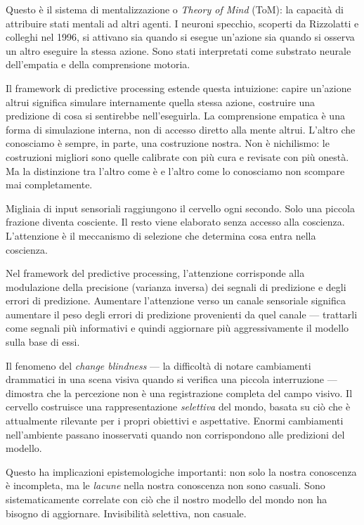 \documentclass[12pt,a4paper,openany]{book}
\newcommand{\sezione}[1]{\vspace{1.2em}{\large\bfseries #1}\vspace{0.5em}\par}
\begin{document}
Questo è il sistema di mentalizzazione o \textit{Theory of Mind} (ToM): la capacità di attribuire stati mentali ad altri agenti. I neuroni specchio, scoperti da Rizzolatti e colleghi nel 1996, si attivano sia quando si esegue un'azione sia quando si osserva un altro eseguire la stessa azione. Sono stati interpretati come substrato neurale dell'empatia e della comprensione motoria.

Il framework di predictive processing estende questa intuizione: capire un'azione altrui significa simulare internamente quella stessa azione, costruire una predizione di cosa si sentirebbe nell'eseguirla. La comprensione empatica è una forma di simulazione interna, non di accesso diretto alla mente altrui. L'altro che conosciamo è sempre, in parte, una costruzione nostra. Non è nichilismo: le costruzioni migliori sono quelle calibrate con più cura e revisate con più onestà. Ma la distinzione tra l'altro come è e l'altro come lo conosciamo non scompare mai completamente.

\sezione{Percezione e attenzione: cosa entra nella coscienza}

Migliaia di input sensoriali raggiungono il cervello ogni secondo. Solo una piccola frazione diventa cosciente. Il resto viene elaborato senza accesso alla coscienza. L'attenzione è il meccanismo di selezione che determina cosa entra nella coscienza.

Nel framework del predictive processing, l'attenzione corrisponde alla modulazione della precisione (varianza inversa) dei segnali di predizione e degli errori di predizione. Aumentare l'attenzione verso un canale sensoriale significa aumentare il peso degli errori di predizione provenienti da quel canale --- trattarli come segnali più informativi e quindi aggiornare più aggressivamente il modello sulla base di essi.

Il fenomeno del \textit{change blindness} --- la difficoltà di notare cambiamenti drammatici in una scena visiva quando si verifica una piccola interruzione --- dimostra che la percezione non è una registrazione completa del campo visivo. Il cervello costruisce una rappresentazione \textit{selettiva} del mondo, basata su ciò che è attualmente rilevante per i propri obiettivi e aspettative. Enormi cambiamenti nell'ambiente passano inosservati quando non corrispondono alle predizioni del modello.

Questo ha implicazioni epistemologiche importanti: non solo la nostra conoscenza è incompleta, ma le \textit{lacune} nella nostra conoscenza non sono casuali. Sono sistematicamente correlate con ciò che il nostro modello del mondo non ha bisogno di aggiornare. Invisibilità selettiva, non casuale.
\end{document}

